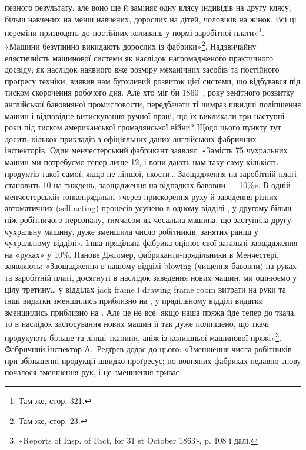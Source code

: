певного результату, але воно ще й заміняє одну клясу індивідів
на другу клясу, більш навчених на менш навчених, дорослих
на дітей, чоловіків на жінок. Всі ці переміни призводять до постійних
коливань у нормі заробітної плати»\footnote{
Там же, стор. 321.
}. «Машини безупинно
викидають дорослих із фабрики»\footnote{
Там же, стор. 23.
}. Надзвичайну елястичність машинової системи як наслідок нагромадженого
практичного досвіду, як наслідок наявного вже розміру механічних
засобів та постійного проґресу техніки, виявив нам бурхливий
розвиток цієї системи, що відбувався під тиском скорочення
робочого дня. Але хто міг би 1860~, року зенітного розвитку
англійської бавовняної промисловости, передбачати ті чимраз
швидші поліпшення машин і відповідне витискування ручної
праці, що їх викликали три наступні роки під тиском американської
громадянської війни? Щодо цього пункту тут досить кількох
прикладів з офіціяльних даних англійських фабричних інспекторів.
Один менчестерський фабрикант заявляє: «Замість 75 чухральних
машин ми потребуємо тепер лише 12, і вони дають нам
таку саму кількість продуктів такої самої, якщо не ліпшої,
якости\dots{} Заощадження на заробітній платі становить 10 на тиждень, заощадження на відпадках бавовни — 10\%».
В одній менчестерській тонкопрядільні «через прискорення руху
й заведення різних автоматичних (self-acting) процесів усунено
в одному відділі , у другому більш ніж  робітничого
персоналу, тимчасом як чесальна машина, що заступила другу чухральну
машину, дуже зменшила число робітників, занятих раніш у чухральному
відділі». Інша прядільна фабрика оцінює свої загальні заощадження
на «руках» у 10\%. Панове Джілмер, фабриканти-прядільники
в Менчестері, заявляють: «Заощадження в нашому відділі
blowing (чищення бавовни) на руках та заробітній платі, досягнуті
в наслідок заведення нових машин, ми оцінюємо у цілу третину\dots{}
у відділах jack frame і drawing frame room витрати на руки та інші
видатки зменшились приблизно на , у прядільному відділі видатки
зменшились приблизно на . Але це не все: якщо наша пряжа
йде тепер до ткача, то в наслідок застосування нових машин її
так дуже поліпшено, що ткачі продукують більше та ліпші тканини,
аніж із колишньої машинової пряжі»\footnote{
«Reports of Insp. of Fact, for 31 st October 1863», p. 108 і далі.
}. Фабричний інспектор
А.~Редґрев додає до цього: «Зменшення числа робітників
при збільшенні продукції швидко проґресує; по вовняних фабриках
недавно знову почалося зменшення рук, і це зменшення триває
